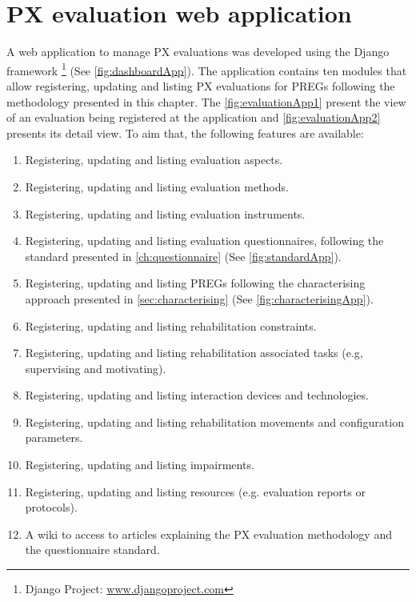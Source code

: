 \chapter{PX evaluation web application}
\label{ch:web_app}

A web application to manage \ac{PX} evaluations was developed using the Django framework \footnote{Django Project: \url{www.djangoproject.com}} (See \autoref{fig:dashboardApp}). The application contains ten modules that allow registering, updating and listing \ac{PX} evaluations for \acp{PREG} following the methodology presented in this chapter. The \autoref{fig:evaluationApp1} present the view of an evaluation being registered at the application and \autoref{fig:evaluationApp2} presents its detail view. To aim that, the following features are available:

\begin{enumerate}
    \item Registering, updating and listing evaluation aspects.
    \item Registering, updating and listing evaluation methods.
    \item Registering, updating and listing evaluation instruments.
    \item Registering, updating and listing evaluation questionnaires, following the standard presented in \autoref{ch:questionnaire} (See \autoref{fig:standardApp}).
    \item Registering, updating and listing \acp{PREG} following the characterising approach presented in \autoref{sec:characterising} (See \autoref{fig:characterisingApp}).
    \item Registering, updating and listing rehabilitation constraints.
    \item Registering, updating and listing rehabilitation associated tasks (e.g, supervising and motivating).
    \item Registering, updating and listing interaction devices and technologies.
    \item Registering, updating and listing rehabilitation movements and configuration parameters.
    \item Registering, updating and listing impairments.
    \item Registering, updating and listing resources (e.g. evaluation reports or protocols).
    \item A wiki to access to articles explaining the \ac{PX} evaluation methodology and the questionnaire standard.
\end{enumerate}

